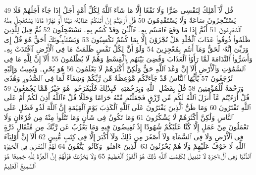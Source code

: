 {\tiny\colorbox{cl_aya}{49}} قُل لَّآ أَمْلِكُ لِنَفْسِى ضَرًّا وَلَا نَفْعًا إِلَّا مَا شَآءَ ٱللَّهُ لِكُلِّ أُمَّةٍ أَجَلٌ إِذَا جَآءَ أَجَلُهُمْ فَلَا يَسْتَـْٔخِرُونَ سَاعَةً وَلَا يَسْتَقْدِمُونَ
{\tiny\colorbox{cl_aya}{50}} قُلْ أَرَءَيْتُمْ إِنْ أَتَىٰكُمْ عَذَابُهُۥ بَيَٰتًا أَوْ نَهَارًا مَّاذَا يَسْتَعْجِلُ مِنْهُ ٱلْمُجْرِمُونَ
{\tiny\colorbox{cl_aya}{51}} أَثُمَّ إِذَا مَا وَقَعَ ءَامَنتُم بِهِۦٓ ءَآلْـَٰٔنَ وَقَدْ كُنتُم بِهِۦ تَسْتَعْجِلُونَ
{\tiny\colorbox{cl_aya}{52}} ثُمَّ قِيلَ لِلَّذِينَ ظَلَمُوا۟ ذُوقُوا۟ عَذَابَ ٱلْخُلْدِ هَلْ تُجْزَوْنَ إِلَّا بِمَا كُنتُمْ تَكْسِبُونَ
{\tiny\colorbox{cl_aya}{53}} وَيَسْتَنۢبِـُٔونَكَ أَحَقٌّ هُوَ قُلْ إِى وَرَبِّىٓ إِنَّهُۥ لَحَقٌّ وَمَآ أَنتُم بِمُعْجِزِينَ
{\tiny\colorbox{cl_aya}{54}} وَلَوْ أَنَّ لِكُلِّ نَفْسٍ ظَلَمَتْ مَا فِى ٱلْأَرْضِ لَٱفْتَدَتْ بِهِۦ وَأَسَرُّوا۟ ٱلنَّدَامَةَ لَمَّا رَأَوُا۟ ٱلْعَذَابَ وَقُضِىَ بَيْنَهُم بِٱلْقِسْطِ وَهُمْ لَا يُظْلَمُونَ
{\tiny\colorbox{cl_aya}{55}} أَلَآ إِنَّ لِلَّهِ مَا فِى ٱلسَّمَٰوَٰتِ وَٱلْأَرْضِ أَلَآ إِنَّ وَعْدَ ٱللَّهِ حَقٌّ وَلَٰكِنَّ أَكْثَرَهُمْ لَا يَعْلَمُونَ
{\tiny\colorbox{cl_aya}{56}} هُوَ يُحْىِۦ وَيُمِيتُ وَإِلَيْهِ تُرْجَعُونَ
{\tiny\colorbox{cl_aya}{57}} يَٰٓأَيُّهَا ٱلنَّاسُ قَدْ جَآءَتْكُم مَّوْعِظَةٌ مِّن رَّبِّكُمْ وَشِفَآءٌ لِّمَا فِى ٱلصُّدُورِ وَهُدًى وَرَحْمَةٌ لِّلْمُؤْمِنِينَ
{\tiny\colorbox{cl_aya}{58}} قُلْ بِفَضْلِ ٱللَّهِ وَبِرَحْمَتِهِۦ فَبِذَٰلِكَ فَلْيَفْرَحُوا۟ هُوَ خَيْرٌ مِّمَّا يَجْمَعُونَ
{\tiny\colorbox{cl_aya}{59}} قُلْ أَرَءَيْتُم مَّآ أَنزَلَ ٱللَّهُ لَكُم مِّن رِّزْقٍ فَجَعَلْتُم مِّنْهُ حَرَامًا وَحَلَٰلًا قُلْ ءَآللَّهُ أَذِنَ لَكُمْ أَمْ عَلَى ٱللَّهِ تَفْتَرُونَ
{\tiny\colorbox{cl_aya}{60}} وَمَا ظَنُّ ٱلَّذِينَ يَفْتَرُونَ عَلَى ٱللَّهِ ٱلْكَذِبَ يَوْمَ ٱلْقِيَٰمَةِ إِنَّ ٱللَّهَ لَذُو فَضْلٍ عَلَى ٱلنَّاسِ وَلَٰكِنَّ أَكْثَرَهُمْ لَا يَشْكُرُونَ
{\tiny\colorbox{cl_aya}{61}} وَمَا تَكُونُ فِى شَأْنٍ وَمَا تَتْلُوا۟ مِنْهُ مِن قُرْءَانٍ وَلَا تَعْمَلُونَ مِنْ عَمَلٍ إِلَّا كُنَّا عَلَيْكُمْ شُهُودًا إِذْ تُفِيضُونَ فِيهِ وَمَا يَعْزُبُ عَن رَّبِّكَ مِن مِّثْقَالِ ذَرَّةٍ فِى ٱلْأَرْضِ وَلَا فِى ٱلسَّمَآءِ وَلَآ أَصْغَرَ مِن ذَٰلِكَ وَلَآ أَكْبَرَ إِلَّا فِى كِتَٰبٍ مُّبِينٍ
{\tiny\colorbox{cl_aya}{62}} أَلَآ إِنَّ أَوْلِيَآءَ ٱللَّهِ لَا خَوْفٌ عَلَيْهِمْ وَلَا هُمْ يَحْزَنُونَ
{\tiny\colorbox{cl_aya}{63}} ٱلَّذِينَ ءَامَنُوا۟ وَكَانُوا۟ يَتَّقُونَ
{\tiny\colorbox{cl_aya}{64}} لَهُمُ ٱلْبُشْرَىٰ فِى ٱلْحَيَوٰةِ ٱلدُّنْيَا وَفِى ٱلْءَاخِرَةِ لَا تَبْدِيلَ لِكَلِمَٰتِ ٱللَّهِ ذَٰلِكَ هُوَ ٱلْفَوْزُ ٱلْعَظِيمُ
{\tiny\colorbox{cl_aya}{65}} وَلَا يَحْزُنكَ قَوْلُهُمْ إِنَّ ٱلْعِزَّةَ لِلَّهِ جَمِيعًا هُوَ ٱلسَّمِيعُ ٱلْعَلِيمُ
